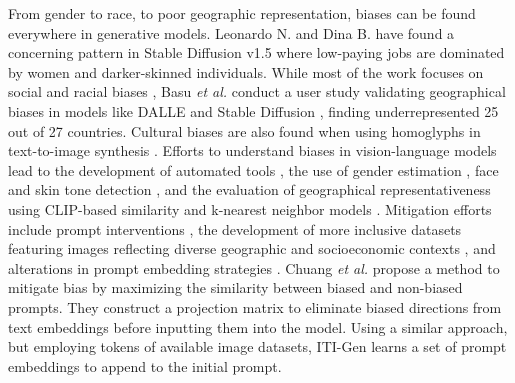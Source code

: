 From gender to race, to poor geographic representation, biases can be found everywhere in generative models. Leonardo N. and Dina B. \cite{bloomberg} have found a concerning pattern in Stable Diffusion v1.5 where low-paying jobs are dominated by women and darker-skinned individuals. While most of the work focuses on social and racial biases \cite{bolukbasi2016man, xu2018fairgan}, Basu \textit{et al.} \cite{basu2023inspecting} conduct a user study validating geographical biases in models like DALLE \cite{ramesh2021zeroshot} and Stable Diffusion \cite{rombach2022highresolution}, finding underrepresented 25 out of 27 countries. Cultural biases are also found when using homoglyphs in text-to-image synthesis \cite{mikolov2013exploiting}. Efforts to understand biases in vision-language models lead to the development of automated tools \cite{cho2023dalleval, luccioni2023stable}, the use of gender estimation \cite{li2023blip2}, face and skin tone detection \cite{Bulat_2017, feng2022racially}, and the evaluation of geographical representativeness using CLIP-based similarity and k-nearest neighbor models \cite{basu2023inspecting}. Mitigation efforts include prompt interventions \cite{bansal2022texttoimage}, the development of more inclusive datasets featuring images reflecting diverse geographic and socioeconomic contexts \cite{NEURIPS2022_5474d9d4, ramaswamy2023geode}, and alterations in prompt embedding strategies \cite{chuang2023debiasing, zhang2023itigen}. Chuang \textit{et al.} \cite{chuang2023debiasing} propose a method to mitigate bias by maximizing the similarity between biased and non-biased prompts. They construct a projection matrix to eliminate biased directions from text embeddings before inputting them into the model. Using a similar approach, but employing tokens of available image datasets, ITI-Gen \cite{zhang2023itigen} learns a set of prompt embeddings to append to the initial prompt.




